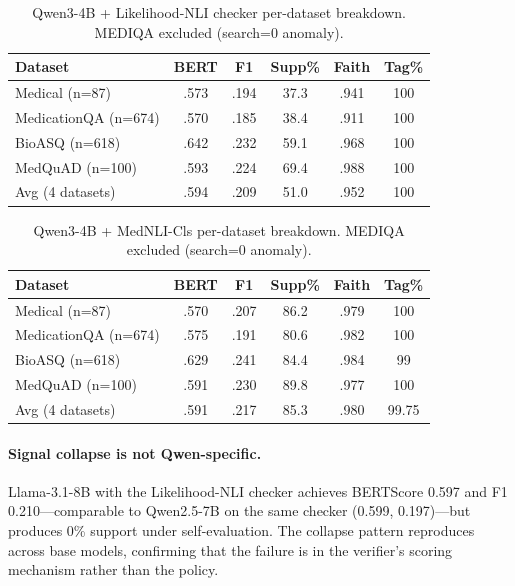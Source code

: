 \documentclass[11pt]{article}
\begin{document}
 \begin{table}[t]
\centering\small
\setlength{\tabcolsep}{4pt}
\begin{tabular}{@{}lccccc@{}}
\toprule
\textbf{Dataset} & \textbf{BERT} & \textbf{F1} & \textbf{Supp\%} 
  & \textbf{Faith} & \textbf{Tag\%} \\
\midrule
Medical (n=87)       & .573 & .194 & 37.3 & .941 & 100 \\
MedicationQA (n=674) & .570 & .185 & 38.4 & .911 & 100 \\
BioASQ (n=618)       & .642 & .232 & 59.1 & .968 & 100 \\
MedQuAD (n=100)      & .593 & .224 & 69.4 & .988 & 100 \\
\midrule
Avg (4 datasets)     & .594 & .209 & 51.0 & .952 & 100 \\
\bottomrule
\end{tabular}
\caption{Qwen3-4B + Likelihood-NLI checker per-dataset
breakdown. MEDIQA excluded (search=0 anomaly).}
\label{tab:qwen3_per_dataset}
\end{table}

\begin{table}[t]
\centering\small
\setlength{\tabcolsep}{4pt}
\begin{tabular}{@{}lccccc@{}}
\toprule
\textbf{Dataset} & \textbf{BERT} & \textbf{F1} & \textbf{Supp\%}
  & \textbf{Faith} & \textbf{Tag\%} \\
\midrule
Medical (n=87)       & .570 & .207 & 86.2 & .979 & 100 \\
MedicationQA (n=674) & .575 & .191 & 80.6 & .982 & 100 \\
BioASQ (n=618)       & .629 & .241 & 84.4 & .984 & 99 \\
MedQuAD (n=100)      & .591 & .230 & 89.8 & .977 & 100 \\
\midrule
Avg (4 datasets)     & .591 & .217 & 85.3 & .980 & 99.75 \\
\bottomrule
\end{tabular}
\caption{Qwen3-4B + MedNLI-Cls per-dataset
breakdown. MEDIQA excluded (search=0 anomaly).}
\label{tab:qwen3_pubmedbert_per_dataset}
\end{table}
\paragraph{Signal collapse is not Qwen-specific.}
Llama-3.1-8B with the Likelihood-NLI checker achieves
BERTScore 0.597 and F1 0.210---comparable to Qwen2.5-7B
on the same checker (0.599, 0.197)---but produces 0\%
support under self-evaluation. The collapse pattern
reproduces across base models, confirming that the
failure is in the verifier's scoring mechanism rather
than the policy.
\end{document}
